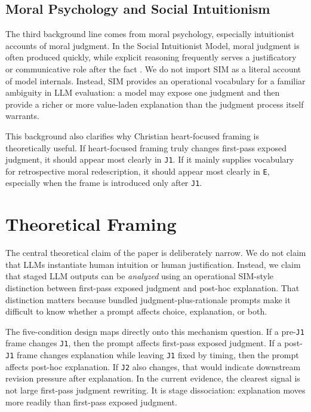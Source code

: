 \documentclass[11pt]{article}
\begin{document}
\subsection{Moral Psychology and Social Intuitionism}

The third background line comes from moral psychology, especially intuitionist accounts of moral judgment. In the Social Intuitionist Model, moral judgment is often produced quickly, while explicit reasoning frequently serves a justificatory or communicative role after the fact \cite{haidt2001}. We do not import SIM as a literal account of model internals. Instead, SIM provides an operational vocabulary for a familiar ambiguity in LLM evaluation: a model may expose one judgment and then provide a richer or more value-laden explanation than the judgment process itself warrants.

This background also clarifies why Christian heart-focused framing is theoretically useful. If heart-focused framing truly changes first-pass exposed judgment, it should appear most clearly in \texttt{J1}. If it mainly supplies vocabulary for retrospective moral redescription, it should appear most clearly in \texttt{E}, especially when the frame is introduced only after \texttt{J1}.

\section{Theoretical Framing}

The central theoretical claim of the paper is deliberately narrow. We do not claim that LLMs instantiate human intuition or human justification. Instead, we claim that staged LLM outputs can be \emph{analyzed} using an operational SIM-style distinction between first-pass exposed judgment and post-hoc explanation. That distinction matters because bundled judgment-plus-rationale prompts make it difficult to know whether a prompt affects choice, explanation, or both.

The five-condition design maps directly onto this mechanism question. If a pre-\texttt{J1} frame changes \texttt{J1}, then the prompt affects first-pass exposed judgment. If a post-\texttt{J1} frame changes explanation while leaving \texttt{J1} fixed by timing, then the prompt affects post-hoc explanation. If \texttt{J2} also changes, that would indicate downstream revision pressure after explanation. In the current evidence, the clearest signal is not large first-pass judgment rewriting. It is stage dissociation: explanation moves more readily than first-pass exposed judgment.
\end{document}
